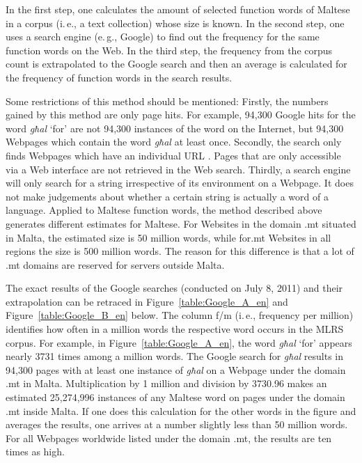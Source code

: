 \begin{multicols}{2}

In the first step, one calculates the amount of selected function words of Maltese in a corpus (i.\,e., a text collection) whose size is known. In the second step, one uses a search engine (e.\,g., Google) to find out the frequency for the same function words on the Web. In the third step, the frequency from the corpus count is extrapolated to the Google search and then an average is calculated for the frequency of function words in the search results.

Some restrictions of this method should be mentioned: Firstly, the numbers gained by this method are only page hits. For example, 94,300 Google hits for the word \emph{għal} `for’ are not 94,300 instances of the word on the Internet, but 94,300 Webpages which contain the word \emph{għal} at least once. Secondly, the search only finds Webpages which have an individual URL \cite{Kilgarriff-Grefenstette:2003}. Pages that are only accessible via a Web interface are not retrieved in the Web search. Thirdly, a search engine will only search for a string irrespective of its environment on a Webpage. It does not make judgements about whether a certain string is actually a word of a language. 
Applied to Maltese function words, the method described above generates different estimates for Maltese. For Websites in the domain .mt situated in Malta, the estimated size is 50 million words, while for.mt Websites in all regions the size is 500 million words. The reason for this difference is that a lot of .mt domains are reserved for servers outside Malta.

The exact results of the Google searches (conducted on July 8, 2011) and their extrapolation can be retraced in Figure~\ref{table:Google_A_en} and Figure~\ref{table:Google_B_en} below. The column f/m (i.\,e., frequency per million) identifies how often in a million words the respective word occurs in the MLRS corpus. For example, in Figure~\ref{table:Google_A_en}, the word \emph{għal} `for’ appears nearly 3731 times among a million words. The Google search for \emph{għal} results in 94,300 pages with at least one instance of \emph{għal} on a Webpage under the domain .mt in Malta. Multiplication by 1 million and division by 3730.96 makes an estimated 25,274,996 instances of any Maltese word on pages under the domain .mt inside Malta. If one does this calculation for the other words in the figure and averages the results, one arrives at a number slightly less than 50 million words. For all Webpages worldwide listed under the domain .mt, the results are ten times as high.


\end{multicols}
